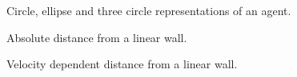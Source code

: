 \documentclass[]{article}
\begin{document}
    



\begin{figure}[H]
\centering
\begin{tikzpicture}


\end{tikzpicture}
\caption{Circle, ellipse and three circle representations of an agent.}
\end{figure}

\newpage

\begin{multicols*}{2}

\end{multicols*}


\newpage


\begin{figure}[H]
\centering
\begin{tikzpicture}


\end{tikzpicture}
\caption{Absolute distance from a linear wall.}
\end{figure}

\begin{figure}[H]
\centering
\begin{tikzpicture}


\end{tikzpicture}
\caption{Velocity dependent distance from a linear wall.}
\end{figure}


\begin{multicols*}{2}

\end{multicols*}

\newpage


\begin{multicols*}{2}



\end{multicols*}

\begin{multicols*}{2}

\end{multicols*}

\begin{multicols*}{2}

\end{multicols*}

\end{document}
